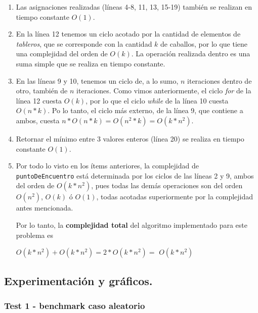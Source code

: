 \begin{enumerate}
  \item Las asignaciones realizadas (líneas 4-8, 11, 13, 15-19) también se realizan en tiempo constante $O(1)$.

  \item En la línea 12 tenemos un ciclo acotado por la cantidad de elementos de \textit{tableros}, que se corresponde con la cantidad $k$ de caballos, por lo que tiene una complejidad del orden de $O(k)$. La operación realizada dentro es una suma simple que se realiza en tiempo constante.

  \item En las líneas 9 y 10, tenemos un ciclo de, a lo sumo, $n$ iteraciones dentro de otro, también de $n$ iteraciones. Como vimos anteriormente, el ciclo \textit{for} de la línea 12 cuesta $O(k)$, por lo que el ciclo
  \textit{while} de la línea 10 cuesta $O(n*k)$. Po lo tanto, el ciclo más externo, de la línea 9, que contiene a ambos, cuesta $n*O(n*k) = O(n^2*k) = O(k*n^2)$.

  \item Retornar el mínimo entre 3 valores enteros (línea 20) se realiza en tiempo constante $O(1)$.

  \item Por todo lo visto en los ítems anteriores, la complejidad de \verb|puntoDeEncuentro| está determinada por los ciclos de las líneas 2 y 9, ambos del orden de $O(k*n^2)$, pues todas las demás operaciones son del orden      $O(n^2)$, $O(k)$ ó $O(1)$, todas acotadas superiormente por la complejidad
  antes mencionada.

Por lo tanto, la \textbf{complejidad total} del algoritmo implementado para este problema es

\begin{center}
  $O(k*n^2) + O(k*n^2) = 2*O(k*n^2) =$ \textit{\textbf{$O(k*n^2)$}}
\end{center}

\end{enumerate}



\newpage
\subsection{Experimentación y gráficos.}

\vspace*{0.3cm}

\subsubsection{Test 1 - benchmark caso aleatorio}


